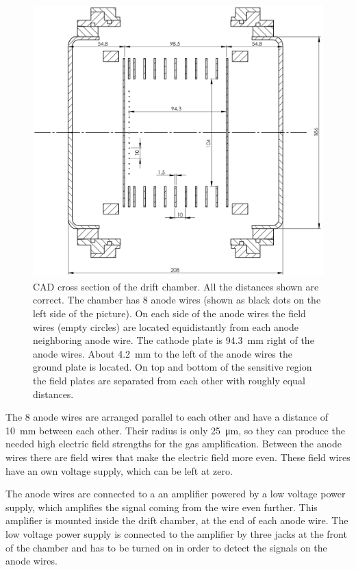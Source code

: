 \documentclass[12pt]{article}
\begin{document}
\begin{figure}[!h]
	\includegraphics[width=13cm]{pics/Driftkammer_Schnittbild.jpg}
	\centering
	\caption{CAD cross section of the drift chamber. All the distances shown are correct. The chamber has 8 anode wires (shown as black dots on the left side of the picture). On each side of the anode wires the field wires (empty circles) are located equidistantly from each anode neighboring anode wire. The cathode plate is \SI{94.3}{\milli\meter} right of the anode wires. About \SI{4.2}{\milli\meter} to the left of the anode wires the ground plate is located. On top and bottom of the sensitive region the field plates are separated from each other with roughly equal distances.}
	\label{fig:drift_chamber_cross_section}
\end{figure}

The 8 anode wires are arranged parallel to each other and have a distance of \SI{10}{\milli\meter} between each other. Their radius is only \SI{25}{\micro\meter}, so they can produce the needed high electric field strengths for the gas amplification. Between the anode wires there are field wires that make the electric field more even. These field wires have an own voltage supply, which can be left at zero. 

The anode wires are connected to a an amplifier powered by a low voltage power supply, which amplifies the signal coming from the wire even further. This amplifier is mounted inside the drift chamber, at the end of each anode wire. The low voltage power supply is connected to the amplifier by three jacks at the front of the chamber and has to be turned on in order to detect the signals on the anode wires. 
\end{document}
